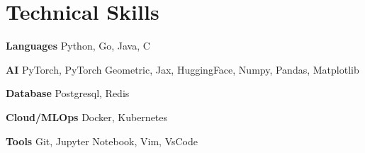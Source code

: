 
\section{Technical Skills}\vspace{-1.0em}
\begin{multicols}{2}
	\begin{compactitem}
		\item \textbf{Languages} Python, Go, Java, C 
		\item \textbf{AI} PyTorch, PyTorch Geometric, Jax, HuggingFace, Numpy, Pandas, Matplotlib 
		\item \textbf{Database} Postgresql, Redis
		
		\item \textbf{Cloud/MLOps} Docker, Kubernetes 
		\item \textbf{Tools} Git, Jupyter Notebook, Vim, VsCode
	\end{compactitem}
\end{multicols}